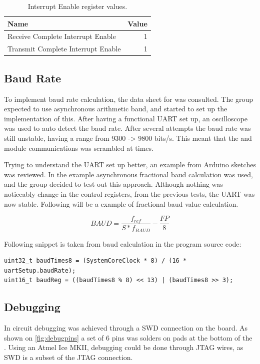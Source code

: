 \begin{table}[H]
	\begin{tabular}{lr}
		\toprule
		Name & Value \\
		\midrule
		Receive Complete Interrupt Enable & 1 \\ 
		Transmit Complete Interrupt Enable & 1 \\ 
		\bottomrule
	\end{tabular} 
	\centering
	\caption{Interrupt Enable register values.}
	\label{tab:UARTINTENSET}
\end{table}

\subsection{Baud Rate}
To implement baud rate calculation, the data sheet for \SAMD was consulted. The group expected to use asynchronous arithmetic baud, and started to set up the implementation of this. After having a functional UART set up, an oscilloscope was used to auto detect the baud rate. After several attempts the baud rate was still unstable, having a range from 9300 -> 9800 bits/s. This meant that the \GPS and \SARA module communications was scrambled at times.
 
Trying to understand the UART set up better, an example from Arduino sketches was reviewed. In the example asynchronous fractional baud calculation was used, and the group decided to test out this approach. Although nothing was noticeably change in the control registers, from the previous tests, the UART was now stable.
Following will be a example of fractional baud value calculation.

\[BAUD = \frac{f_{ref}}{S*f_{BAUD}} - \frac{FP}{8}\]

Following snippet is taken from baud calculation in the program source code:
\begin{verbatim}
uint32_t baudTimes8 = (SystemCoreClock * 8) / (16 * uartSetup.baudRate);
uint16_t baudReg = ((baudTimes8 % 8) << 13) | (baudTimes8 >> 3);	
\end{verbatim}

\subsection{Debugging}
In circuit debugging was achieved through a SWD connection on the \MKR board. As shown on \cref{fig:debugpins} a set of 6 pins was solders on pads at the bottom of the \MKR. Using an Atmel Ice MKII, debugging could be done through JTAG wires, as SWD is a subset of the JTAG connection.

